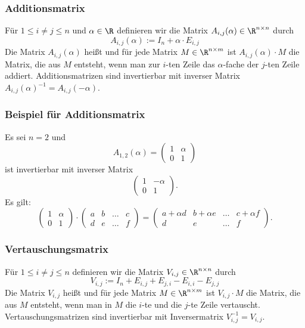 %
\begin{frame}\frametitle{Additionsmatrix}
Für $1\le i \ne j \le n$ und $\alpha \in \R$ definieren wir die Matrix $A_{i,j}(\alpha) \in \R^{n\times n}$ durch
$$
A_{i,j}(\alpha):=I_n + \alpha \cdot E_{i,j}
$$
Die Matrix $A_{i,j}(\alpha)$ heißt  und für jede Matrix $M \in \R^{n\times m}$ ist $A_{i,j}(\alpha)\cdot M$ die Matrix, die aus $M$ entsteht, wenn man zur $i$-ten Zeile das $\alpha$-fache der $j$-ten Zeile addiert.
\vfill
Additionsmatrizen sind invertierbar mit inverser Matrix $A_{i,j}(\alpha)^{-1}=A_{i,j}(-\alpha)$.
\end{frame}
%
\begin{frame}\frametitle{Beispiel für Additionsmatrix}
Es sei $n=2$ und 
	$$
		A_{1,2}(\alpha)=\begin{pmatrix}
			1 & \alpha\\
			0 & 1
		\end{pmatrix}
	$$
	ist invertierbar mit inverser Matrix
	$$
		\begin{pmatrix}
			1 & -\alpha\\
			0 & 1
		\end{pmatrix}.
	$$ \pause
	Es gilt:
	$$
		\begin{pmatrix}
			1 & \alpha\\
			0 & 1
		\end{pmatrix} 
		\cdot
		\begin{pmatrix}
			a & b & \ldots & c\\
			d & e  & \ldots & f
		\end{pmatrix}
		=
		\begin{pmatrix}
			a +\alpha d& b + \alpha e & \ldots & c + \alpha f\\
			d & e  & \ldots & f
		\end{pmatrix}.
	$$
	
\end{frame}
%
%
\begin{frame}\frametitle{Vertauschungsmatrix}
Für $1\le i \ne j \le n$ definieren wir die Matrix $V_{i,j} \in \R^{n\times n}$ durch
$$
V_{i,j}:=I_n +  E_{i,j}+  E_{j,i}-  E_{i,i}-  E_{j,j}
$$
Die Matrix $V_{i,j}$ heißt  und für jede Matrix $M \in \R^{n\times m}$ ist $V_{i,j}\cdot M$ die Matrix, die aus $M$ entsteht, wenn man in $M$ die $i$-te und die $j$-te Zeile vertauscht.
\vfill
Vertauschungsmatrizen sind invertierbar mit Inversermatrix $V_{i,j}^{-1}=V_{i,j}$.
\end{frame}
%
%
